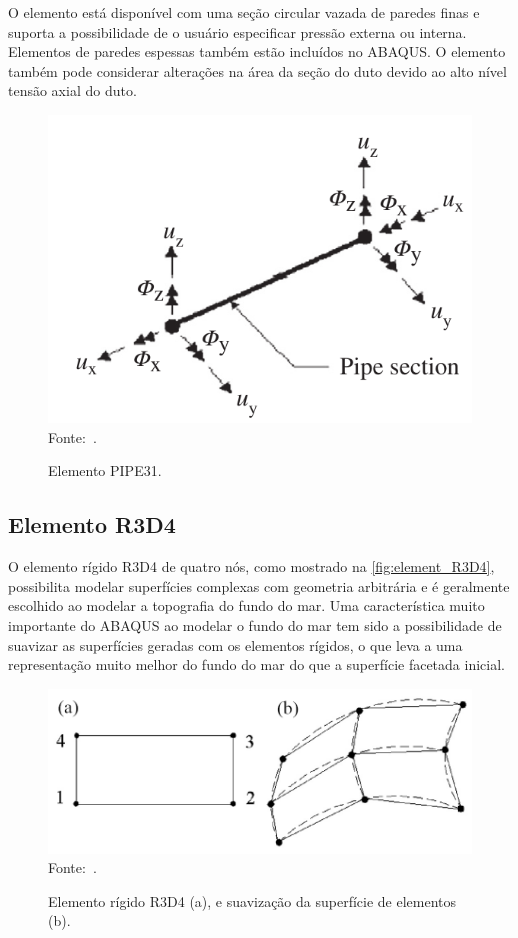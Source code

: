 O elemento está disponível com uma seção circular vazada de paredes finas e suporta a possibilidade de o usuário especificar pressão externa ou interna.
Elementos de paredes espessas também estão incluídos no ABAQUS.
O elemento também pode considerar alterações na área da seção do duto devido ao alto nível tensão axial do duto.

\begin{figure}[!ht]
    \centering
    \caption{Elemento PIPE31.}\label{fig:elemen_PIPE31H}
    \includegraphics[width=0.5\linewidth]{imagens/elemen_PIPE31H}
    \\Fonte:~.
\end{figure}

\subsection{Elemento R3D4}

O elemento rígido R3D4 de quatro nós, como mostrado na \autoref{fig:element_R3D4}, possibilita modelar superfícies complexas com geometria arbitrária e é geralmente escolhido ao modelar a topografia do fundo do mar. Uma característica muito importante do ABAQUS ao modelar o fundo do mar tem sido a possibilidade de suavizar as superfícies geradas com os elementos rígidos, o que leva a uma representação muito melhor do fundo do mar do que a superfície facetada inicial.

\begin{figure}[th!]
    \centering
    \caption{Elemento rígido R3D4 (a), e suavização da superfície de elementos (b).}\label{fig:element_R3D4}
    \includegraphics[width=0.7\linewidth]{imagens/element_R3D4}
    \\Fonte:~.
\end{figure}

